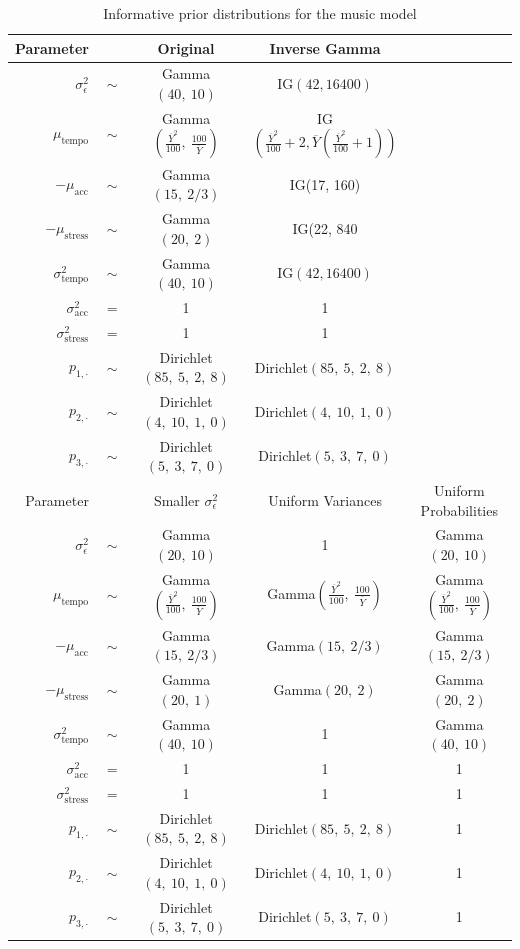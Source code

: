 \documentclass[aoas]{imsart}
\begin{document}
\begin{table}[t]
    \caption{Informative prior distributions for the music model}
  \label{tab:morepriors}
  \centering
  \begin{tabular}{@{}rcccc@{}}
    \toprule
    Parameter & \phantom{a} & Original & Inverse Gamma \\
    \midrule
    $\sigma^2_{\epsilon}$ & $\sim$ & Gamma$(40,\ 10)$ & IG$(42,16400)$\\
    $\mu_{\textrm{tempo}}$ & $\sim$ & Gamma$\left(\frac{\overline{Y}^2}{100},\ \frac{100}{\overline{Y}}\right)$ & IG$\left(\frac{\overline{Y}^2}{100}+2, \overline{Y}(\frac{\overline{Y}^2}{100}+1)\right)$\\
    $-\mu_{\textrm{acc}} $ & $\sim$ & Gamma$(15,\ 2/3)$ & IG(17, 160)\\
    $-\mu_{\textrm{stress}} $ & $\sim$ & Gamma$(20,\ 2)$ & IG(22, 840\\
    $\sigma^2_{\textrm{tempo}} $ & $\sim$ & Gamma$(40,\ 10)$ & IG$(42,16400)$\\
    $\sigma^2_{\textrm{acc}} $ & $=$ & 1 &  1\\
    $\sigma^2_{\textrm{stress}} $ & $=$ & 1 & 1\\
    $p_{1,\cdot}$ & $\sim$ & Dirichlet$(85,\ 5,\ 2,\ 8)$& Dirichlet$(85,\ 5,\ 2,\ 8)$ \\
    $p_{2,\cdot}$ & $\sim$ & Dirichlet$(4,\ 10,\ 1,\ 0)$& Dirichlet$(4,\ 10,\ 1,\ 0)$ \\
    $p_{3,\cdot}$ & $\sim$ & Dirichlet$(5,\ 3,\ 7,\ 0)$& Dirichlet$(5,\ 3,\ 7,\ 0)$ \\
    \midrule
    Parameter & \phantom{a} & Smaller $\sigma^2_\epsilon$ &
    Uniform Variances & Uniform Probabilities\\
    \midrule
    $\sigma^2_{\epsilon}$ & $\sim$ & Gamma$(20,\ 10)$ & 1 & Gamma$(20,\ 10)$ \\
    $\mu_{\textrm{tempo}}$ & $\sim$ & Gamma$\left(\frac{\overline{Y}^2}{100},\ \frac{100}{\overline{Y}}\right)$ & Gamma$\left(\frac{\overline{Y}^2}{100},\ \frac{100}{\overline{Y}}\right)$ & Gamma$\left(\frac{\overline{Y}^2}{100},\ \frac{100}{\overline{Y}}\right)$ \\
    $-\mu_{\textrm{acc}} $ & $\sim$ & Gamma$(15,\ 2/3)$ & Gamma$(15,\ 2/3)$ & Gamma$(15,\ 2/3)$\\
    $-\mu_{\textrm{stress}} $ & $\sim$ & Gamma$(20,\ 1)$ & Gamma$(20,\ 2)$ & Gamma$(20,\ 2)$ \\
    $\sigma^2_{\textrm{tempo}} $ & $\sim$ & Gamma$(40,\ 10)$ & 1 & Gamma$(40,\ 10)$\\
    $\sigma^2_{\textrm{acc}} $ & $=$ & 1 &  1 & 1\\
    $\sigma^2_{\textrm{stress}} $ & $=$ & 1 & 1 & 1\\
    $p_{1,\cdot}$ & $\sim$ & Dirichlet$(85,\ 5,\ 2,\ 8)$& Dirichlet$(85,\ 5,\ 2,\ 8)$& 1 \\
    $p_{2,\cdot}$ & $\sim$ & Dirichlet$(4,\ 10,\ 1,\ 0)$& Dirichlet$(4,\ 10,\ 1,\ 0)$& 1 \\
    $p_{3,\cdot}$ & $\sim$ & Dirichlet$(5,\ 3,\ 7,\ 0)$& Dirichlet$(5,\ 3,\ 7,\ 0)$& 1 \\
    \bottomrule
  \end{tabular}
\end{table}
\end{document}
